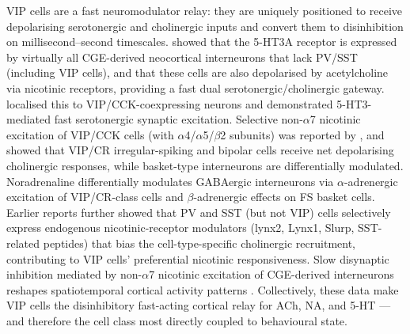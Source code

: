 \documentclass[11pt]{article}
\begin{document}
VIP cells are a fast neuromodulator relay: they are uniquely positioned to receive depolarising serotonergic and cholinergic inputs and convert them to disinhibition on millisecond--second timescales. \citet{Lee2010} showed that the 5-HT3A receptor is expressed by virtually all CGE-derived neocortical interneurons that lack PV/SST (including VIP cells), and that these cells are also depolarised by acetylcholine via nicotinic receptors, providing a fast dual serotonergic/cholinergic gateway. \citet{Ferezou2002} localised this to VIP/CCK-coexpressing neurons and demonstrated 5-HT3-mediated fast serotonergic synaptic excitation. Selective non-$\alpha$7 nicotinic excitation of VIP/CCK cells (with $\alpha$4/$\alpha$5/$\beta$2 subunits) was reported by \citet{Porter1999}, and \citet{Kawaguchi1997b} showed that VIP/CR irregular-spiking and bipolar cells receive net depolarising cholinergic responses, while basket-type interneurons are differentially modulated. Noradrenaline differentially modulates GABAergic interneurons via $\alpha$-adrenergic excitation of VIP/CR-class cells and $\beta$-adrenergic effects on FS basket cells. Earlier reports \citep{Demars2014} further showed that PV and SST (but not VIP) cells selectively express endogenous nicotinic-receptor modulators (lynx2, Lynx1, Slurp, SST-related peptides) that bias the cell-type-specific cholinergic recruitment, contributing to VIP cells' preferential nicotinic responsiveness. Slow disynaptic inhibition mediated by non-$\alpha$7 nicotinic excitation of CGE-derived interneurons reshapes spatiotemporal cortical activity patterns \citep{Arroyo2012}. Collectively, these data make VIP cells the disinhibitory fast-acting cortical relay for ACh, NA, and 5-HT --- and therefore the cell class most directly coupled to behavioural state.
\end{document}
